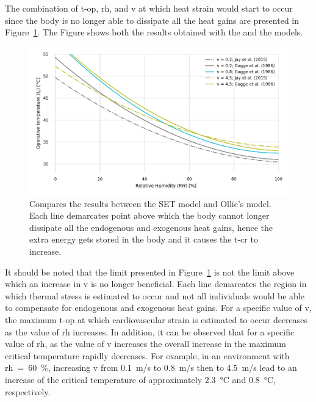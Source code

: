 The combination of \ac{t-op}, \ac{rh}, and \ac{v} at which heat strain would start to occur since the body is no longer able to dissipate all the heat gains are presented in Figure~\ref{fig:comparison_air_speed}.
The Figure shows both the results obtained with the and the  models.

\begin{figure}[b!]
    \centering
    \includegraphics[width=\textwidth]{figures/comparison_air_speed.png}
    \caption{Compares the results between the SET model and Ollie's model.
    Each line demarcates point above which the body cannot longer dissipate all the endogenous and exogenous heat gains, hence the extra energy gets stored in the body and it causes the \acf{t-cr} to increase.}
    \label{fig:comparison_air_speed}
\end{figure}

It should be noted that the limit presented in Figure~\ref{fig:comparison_air_speed} is not the limit above which an increase in \ac{v} is no longer beneficial.
Each line demarcates the region in which thermal stress is estimated to occur and not all individuals would be able to compensate for endogenous and exogenous heat gains.
For a specific value of \ac{v}, the maximum \ac{t-op} at which cardiovascular strain is estimated to occur decreases as the value of \ac{rh} increases.
In addition, it can be observed that for a specific value of \ac{rh}, as the value of \ac{v} increases the overall increase in the maximum critical temperature rapidly decreases.
For example, in an environment with \ac{rh}~=~60~\%, increasing \ac{v} from 0.1~m/s to 0.8~m/s then to 4.5~m/s lead to an increase of the critical temperature of approximately 2.3~°C and 0.8~°C, respectively.

